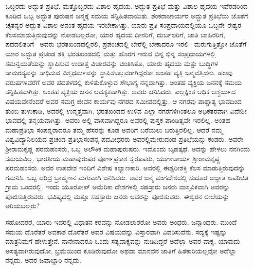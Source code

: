 ಒಬ್ಬರದು ಅದ್ಭುತ ಪ್ರತಿಭೆ. ಮತ್ತೊಬ್ಬರದು ವಿಶಾಲ ಹೃದಯ. ಅದ್ಭುತ ಪ್ರತಿಭೆ ಮತ್ತು ವಿಶಾಲ ಹೃದಯ ಇವೆರಡರಿಂದ ಕೂಡಿದ ಒಬ್ಬ ಅದ್ಭುತ ಪುರುಷನ ಜನ್ಮಕ್ಕೆ ಸಮಯ ಸನ್ನಿಹಿತವಾಯಿತು. ಶಂಕರಾಚಾರ್ಯರ ಅದ್ಭುತ ಪ್ರತಿಭೆಯ ಜೊತೆಗೆ ಚೈತನ್ಯರ ಅದ್ಭುತ ವಿಶಾಲ ಅನಂತ ಹೃದಯ ಇರಬೇಕಾಗಿತ್ತು. ಯಾರು ಪ್ರತಿ ಸಂಪ್ರದಾಯದಲ್ಲಿಯೂ ಒಬ್ಬನೇ ಈಶ್ವರ ಕೆಲಸಮಾಡುತ್ತಿರುವುದನ್ನು ನೋಡಬಲ್ಲರೋ, ಯಾರ ಹೃದಯ ದೀನರಿಗೆ, ದುರ್ಬಲರಿಗೆ, ಜಾತಿ ಬಾಹಿರರಿಗೆ, ಪದದಲಿತರಿಗೆ– ಅವರು ಭರತಖಂಡದಲ್ಲಿರಲಿ, ಪ್ರಪಂಚದಲ್ಲಿ ಬೇರೆಲ್ಲಿ ಬೇಕಾದರೂ ಇರಲಿ– ಮರುಗುತ್ತಿತ್ತೋ ಜೊತೆಗೆ ಯಾರ ಅದ್ಭುತ ಪ್ರಚಂಡ ಶಕ್ತಿ ಭರತಖಂಡದಲ್ಲಿ ಮತ್ತು ಹೊರಗೆ ಇರುವ ಭಿನ್ನ ಭಿನ್ನ ಸಂಪ್ರದಾಯಗಳಲ್ಲಿ ಸಮನ್ವಯತೆಯನ್ನು ಸ್ಥಾಪಿಸುವ ಉದಾತ್ತ ವಿಚಾರವನ್ನು ಚಿಂತಿಸಿತೊ, ಯಾರು ಹೃದಯ ಮತ್ತು ಬುದ್ಧಿಗಳ ಸಾಮರಸ್ಯವನ್ನು ಸಾಧಿಸುವ ವಿಶ್ವಧರ್ಮವನ್ನು ಸ್ಥಾಪಿಸಬಲ್ಲವರಾಗಿದ್ದರೋ ಅಂತಹ ವ್ಯಕ್ತಿ ಜನ್ಮವೆತ್ತಿದನು. ಹಲವು ವರುಷಗಳವರೆಗೆ ಅವರ ಪದತಳದಲ್ಲಿ ಕುಳಿತುಕೊಳ್ಳುವ ಸೌಭಾಗ್ಯ ನನ್ನದಾಗಿತ್ತು. ಅಂತಹ ವ್ಯಕ್ತಿಯ ಜನನಕ್ಕೆ ಸಮಯ ಸನ್ನಿಹಿತವಾಗಿತ್ತು. ಅಂತಹ ವ್ಯಕ್ತಿಯ ಜನನ ಆವಶ್ಯಕವಾಗಿತ್ತು. ಅವರು ಜನಿಸಿದರು. ಎಲ್ಲಕ್ಕಿಂತ ಅಧಿಕ ಆಶ್ಚರ್ಯದ ವಿಷಯವೇನೆಂದರೆ ಅವರ ಸಮಗ್ರ ಜೀವನ ಕಾರ್ಯವು ನಗರದ ಸಮೀಪದಲ್ಲಿತ್ತು. ಆ ನಗರವು ಪಾಶ್ಚಾತ್ಯ ಭಾವದಿಂದ ತುಂಬಿ ತುಳುಕಾಡಿ, ಅದರಲ್ಲಿ ಉನ್ಮತ್ತವಾಗಿ, ಭರತಖಂಡದ ಉಳಿದ ಎಲ್ಲಾ ನಗರಗಳಿಗಿಂತಲೂ ಅಧಿಕತರವಾಗಿ ವಿದೇಶೀ ಭಾವದಲ್ಲಿ ತನ್ಮಯವಾಗಿತ್ತು. ಅವರು ಅಲ್ಲಿ ವಾಸವಾಗಿದ್ದರೂ ಅವರಲ್ಲಿ ಪುಸ್ತಕ ಪಾಂಡಿತ್ಯವೇ ಇರಲಿಲ್ಲ. ಅಂತಹ ಮಹಾಪ್ರತಿಭಾ ಸಂಪನ್ನರಾದರೂ ತಮ್ಮ ಹೆಸರನ್ನು ಕೂಡ ಅವರಿಗೆ ಬರೆಯಲು ಬರುತ್ತಿರಲಿಲ್ಲ. ಆದರೆ ನಮ್ಮ ವಿಶ್ವವಿದ್ಯಾನಿಲಯದ ಪ್ರಚಂಡ ಪ್ರತಿಭಾಸಂಪನ್ನ ಪದವೀಧರರು ಅವರಲ್ಲಿ\break ಮೇರುದಂಡ ಪ್ರತಿಭೆಯನ್ನು ಕಂಡರು. ಅವರೇ ಶ‍್ರೀರಾಮಕೃಷ್ಣ ಪರಮಹಂಸರು, ಒಬ್ಬ ಅಲೌಕಿಕ ಮಹಾಪುರುಷರು. ಇದೊಂದು ಬೃಹತ್ಕಥೆ. ಅದನ್ನು ಹೇಳಲು ನನಗಿಂದು ಸಮಯವಿಲ್ಲ. ಭಾರತೀಯ ಮಹಾಪುರುಷರ ಪೂರ್ಣಪ್ರಕಾಶ ಸ್ವರೂಪರು, ಯುಗಾಚಾರ್ಯ ಶ‍್ರೀರಾಮಕೃಷ್ಣ ಪರಮಹಂಸರು. ಅವರ ಉಪದೇಶ ಇಂದಿಗೆ ವಿಶೇಷ ಕಲ್ಯಾಣಕಾರಿ. ಅವರಲ್ಲಿ ಈಶ್ವರೀಶಕ್ತಿ ಕೆಲಸ ಮಾಡುತ್ತಿರುವುದನ್ನು ಗಮನಿಸಿ. ಒಬ್ಬ ದರಿದ್ರ ಬ್ರಾಹ್ಮಣನ ಮಗುವಾಗಿ ಜನಿಸಿದರು. ಅವರ ಜನ್ಮ ವಂಗದೇಶದಲ್ಲಿ ಸುದೂರ ಅಜ್ಞಾತ ಅಪರಿಚಿತ ಗ್ರಾಮ ಒಂದರಲ್ಲಿ. ಇಂದು ಯೂರೋಪ್​ ಅಮೆರಿಕಾ ದೇಶಗಳಲ್ಲಿ ಸಹಸ್ರಾರು ಜನರು ವಾಸ್ತವಿಕವಾಗಿ ಅವರನ್ನು ಪೂಜಿಸುತ್ತಿರುವರು. ಭವಿಷ್ಯದಲ್ಲಿ ಮತ್ತೂ ಸಹಸ್ರಾರು ಜನರು ಅವರನ್ನು ಪೂಜಿಸುವರು. ಈಶ್ವರನ ಲೀಲೆಯನ್ನು ಅರಿಯಬಲ್ಲರು?

ಸಹೋದರರೆ, ಯಾರು ಇದರಲ್ಲಿ ವಿಧಾತನ ಕರವನ್ನು ನೋಡಲಾರರೋ ಅವರು ಅಂಧರು, ಜನ್ಮಾಂಧರು. ಮುಂದೆ ಸಮಯ ದೊರೆತರೆ ಅವಕಾಶ ದೊರೆತರೆ ಅವರ ವಿಷಯವನ್ನು ವಿಸ್ತಾರವಾಗಿ ವಿವರಿಸುವೆನು. ಸದ್ಯಕ್ಕೆ ಇಷ್ಟನ್ನು ಮಾತ್ರನಿಮಗೆ ಹೇಳುತ್ತೇನೆ. ನಾನೇನಾದರೂ ಒಂದು ಸತ್ಯವಾಕ್ಯವನ್ನು ನುಡಿದಿದ್ದರೆ ಅದೆಲ್ಲಾ ಅವರ ವಾಕ್ಯ. ಯಾವುದು ಅಸತ್ಯವಾಗಿರುವುದೋ, ಭ್ರಮೆಯಿಂದ ಕೂಡಿರುವುದೋ ಅಥವಾ ಮಾನವನ ಜಾತಿಗೆ ಹಿತಕಾರಿಯಲ್ಲವೋ ಅದೆಲ್ಲಾ ನನ್ನದು. ಅದರ ಜವಾಬ್ದಾರಿ ನನ್ನದು. 

